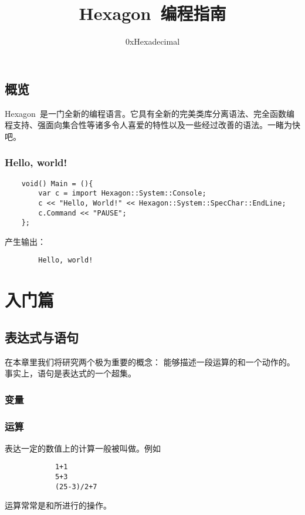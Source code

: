 \documentclass{tufte-book}
\begin{document}
\setlength{\parindent}{2em}
\setcounter{tocdepth}{1}

\frontmatter

\title{Hexagon~编程指南}
\author{0xHexadecimal}
\maketitle

\chapter{概览}
Hexagon~是一门全新的编程语言。它具有全新的完美类库分离语法、完全函数编程支持、强面向集合性等诸多令人喜爱的特性以及一些经过改善的语法。一睹为快吧。
\section{Hello, world!}
	\begin{verbatim}
	void() Main = (){
		var c = import Hexagon::System::Console;
		c << "Hello, World!" << Hexagon::System::SpecChar::EndLine;
		c.Command << "PAUSE";
	};
	\end{verbatim}
	产生输出：
	\begin{verbatim}
		Hello, world!
	\end{verbatim}


\tableofcontents

\listoffigures

\listoftables

\mainmatter
\part{入门篇}

	\chapter{表达式与语句}
		在本章里我们将研究两个极为重要的概念：
		能够描述一段运算的和一个动作的。
		事实上，语句是表达式的一个超集。
		\section{变量}
			
		\section{运算}
			表达一定的数值上的计算一般被叫做。例如
			\begin{verbatim}
			1+1
			5+3
			(25-3)/2+7
			\end{verbatim}
			运算常常是和所进行的操作。
			
\end{document}
